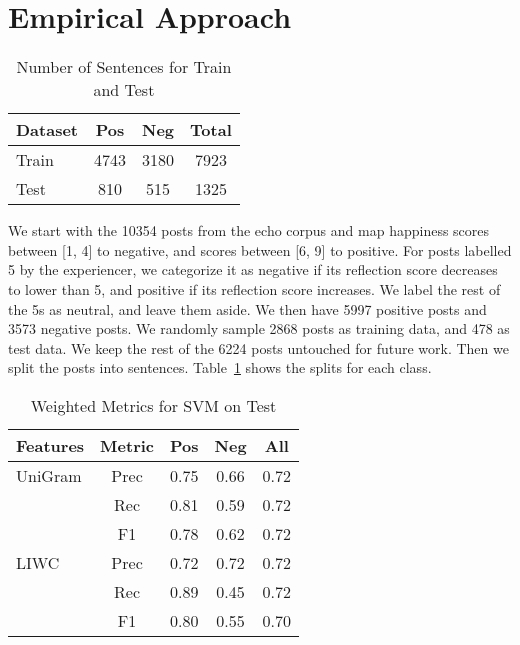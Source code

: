 \documentclass[11pt,letterpaper]{article}
\begin{document}
\section{Empirical Approach}
\label{method-overview-sec}

\begin{table}[h!t]
\footnotesize
\centering
\begin{tabularx}{2.55in}{p{0.7in}| c c c  }
\toprule
\bf  Dataset & \bf Pos & \bf Neg & \bf Total  \\
\midrule
Train &  4743 &  3180 & 7923  \\
Test &  810 & 515 & 1325 \\ 
\bottomrule
\end{tabularx}
\caption{\label{tab:data-split} Number of Sentences for Train and Test}
\end{table} 

We start with the 10354 posts from the {\sc echo} corpus 
and map happiness scores between [1, 4] to negative,
and scores between [6, 9] to positive. For posts labelled 5 by the
experiencer, we categorize it as negative if its {\sc reflection} score
decreases to lower than 5, and positive if its {\sc reflection} score
increases. We label the rest of the 5s as neutral, and leave them
aside. We then have 5997 positive posts and 3573 negative posts. We
randomly sample 2868 posts as training data, and 478 as test
data. We keep the rest of the 6224 posts untouched for future work. Then we split the posts into sentences. Table~\ref{tab:data-split} shows the splits for each class.

\begin{table}[h!t]
\footnotesize
\centering
\begin{tabularx}{2.55in}{p{0.55in}| c| c c  c}
\toprule
\bf Features & \bf Metric & \bf Pos & \bf Neg & \bf All  \\
\midrule
UniGram &  Prec &  0.75  & 0.66 &  0.72  \\
        &  Rec & 0.81 & 0.59  & 0.72 \\ 
        &  F1 &  0.78 & 0.62 & 0.72 \\
\midrule
LIWC &  Prec & 0.72 & 0.72 & 0.72  \\
     &  Rec & 0.89 & 0.45 & 0.72  \\
     &  F1 & 0.80 & 0.55 &  0.70 \\
\bottomrule
\end{tabularx}
\caption{\label{tab:baseline-SVM-results} Weighted Metrics for SVM on Test}
\end{table}  
\end{document}
